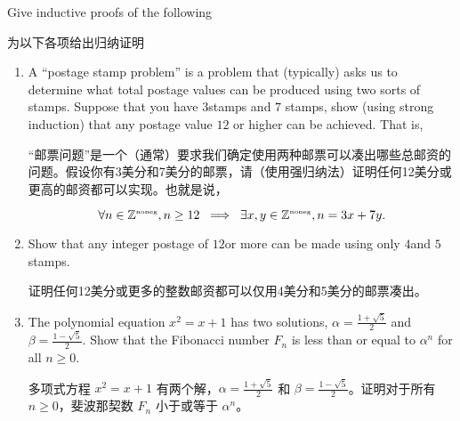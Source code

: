 Give inductive proofs of the following 

为以下各项给出归纳证明
\begin{enumerate}
\item A ``postage stamp problem'' is a problem that (typically) asks
us to determine what total postage values can be produced using two
sorts of stamps.
Suppose that you have $3$\cents stamps and $7$\cents 
stamps, show (using strong induction) that any postage value $12$\cents 
or higher can be achieved.
That is, 

“邮票问题”是一个（通常）要求我们确定使用两种邮票可以凑出哪些总邮资的问题。假设你有3美分和7美分的邮票，请（使用强归纳法）证明任何12美分或更高的邮资都可以实现。也就是说，

\[ \forall n \in {\mathbb Z}^{\mbox{\tiny noneg}}, n \geq 12 \; \implies \; \exists x,y \in {\mathbb Z}^{\mbox{\tiny noneg}} , n = 3x + 7y.
\]
 
 \wbvfill

\workbookpagebreak

\item Show that any integer postage of $12$\cents or more can be made using
only $4$\cents and $5$\cents stamps.

证明任何12美分或更多的整数邮资都可以仅用4美分和5美分的邮票凑出。
\wbvfill


\item The polynomial equation $x^2 = x+1$ has two solutions, 
$\alpha = \frac{1+\sqrt{5}}{2}$ and $\beta = \frac{1-\sqrt{5}}{2}$.
Show that the Fibonacci number $F_n$ is less than or equal to $\alpha^{n}$
for all $n \geq 0$.

多项式方程 $x^2 = x+1$ 有两个解，$\alpha = \frac{1+\sqrt{5}}{2}$ 和 $\beta = \frac{1-\sqrt{5}}{2}$。证明对于所有 $n \geq 0$，斐波那契数 $F_n$ 小于或等于 $\alpha^{n}$。
\wbvfill

\workbookpagebreak

\end{enumerate}


